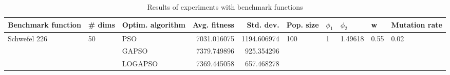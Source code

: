 \begin{table}
\centering
\caption{Results of experiments with benchmark functions}
\begin{tabular}{lllrrlllll}
\toprule
           Benchmark function &             \# dims & Optim. algorithm &  Avg. fitness &   Std. dev. &            Pop. size &         $\phi_{1}$ &               $\phi_{2}$ &                     w &         Mutation rate \\
\midrule
\multirow{3}{*}{Schwefel 226} & \multirow{3}{*}{50} &              PSO &   7031.016075 & 1194.606974 & \multirow{3}{*}{100} & \multirow{3}{*}{1} & \multirow{3}{*}{1.49618} & \multirow{3}{*}{0.55} & \multirow{3}{*}{0.02} \\
                              &                     &            GAPSO &   7379.749896 &  925.354296 &                      &                    &                          &                       &                       \\
                              &                     &          LOGAPSO &   7369.445058 &  657.468278 &                      &                    &                          &                       &                       \\
\bottomrule
\end{tabular}
\end{table}
